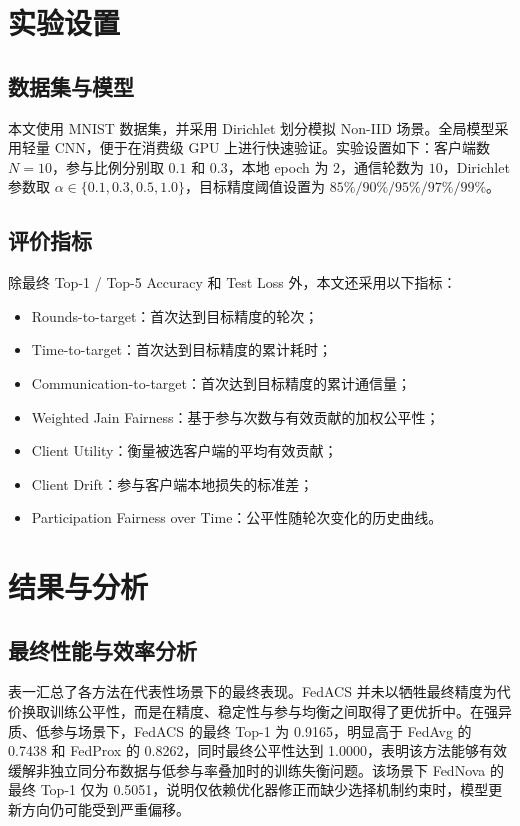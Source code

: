 \documentclass[UTF8,11pt]{ctexart}
\begin{document}
\section{实验设置}
\subsection{数据集与模型}
本文使用 MNIST 数据集，并采用 Dirichlet 划分模拟 Non-IID 场景。全局模型采用轻量 CNN，便于在消费级 GPU 上进行快速验证。实验设置如下：客户端数 $N=10$，参与比例分别取 $0.1$ 和 $0.3$，本地 epoch 为 $2$，通信轮数为 $10$，Dirichlet 参数取 $\alpha \in \{0.1, 0.3, 0.5, 1.0\}$，目标精度阈值设置为 $85\%/90\%/95\%/97\%/99\%$。

\subsection{评价指标}
除最终 Top-1 / Top-5 Accuracy 和 Test Loss 外，本文还采用以下指标：
\begin{itemize}
  \item Rounds-to-target：首次达到目标精度的轮次；
  \item Time-to-target：首次达到目标精度的累计耗时；
  \item Communication-to-target：首次达到目标精度的累计通信量；
  \item Weighted Jain Fairness：基于参与次数与有效贡献的加权公平性；
  \item Client Utility：衡量被选客户端的平均有效贡献；
  \item Client Drift：参与客户端本地损失的标准差；
  \item Participation Fairness over Time：公平性随轮次变化的历史曲线。
\end{itemize}

\section{结果与分析}
\subsection{最终性能与效率分析}

表一汇总了各方法在代表性场景下的最终表现。FedACS 并未以牺牲最终精度为代价换取训练公平性，而是在精度、稳定性与参与均衡之间取得了更优折中。在强异质、低参与场景下，FedACS 的最终 Top-1 为 0.9165，明显高于 FedAvg 的 0.7438 和 FedProx 的 0.8262，同时最终公平性达到 1.0000，表明该方法能够有效缓解非独立同分布数据与低参与率叠加时的训练失衡问题。该场景下 FedNova 的最终 Top-1 仅为 0.5051，说明仅依赖优化器修正而缺少选择机制约束时，模型更新方向仍可能受到严重偏移。
\end{document}
